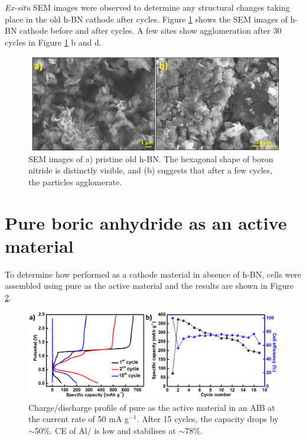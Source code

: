 \textit{Ex-situ} SEM images were observed to determine any structural changes taking place in the old h-BN cathode after cycles. Figure \ref{Figures/BOhBN:hBNSEM} shows the SEM images of h-BN cathode before and after cycles. A few sites show agglomeration after 30 cycles in Figure \ref{Figures/BOhBN:hBNSEM} b and d.

\begin{figure}[tbh!]
\centering
\includegraphics[width=\textwidth]{Figures/BOhBN/hBNSEM}
\caption{SEM images of a) pristine old h-BN. The hexagonal shape of boron nitride is distinctly visible, and (b) suggests that after a few cycles, the particles agglomerate.}
\label{Figures/BOhBN:hBNSEM}
\end{figure}



\section*{Pure boric anhydride  as an active material}
To determine how  performed as a cathode material in absence of h-BN, cells were assembled using pure  as the active material and the results are shown in Figure \ref{Figures/BOhBN:BOCDC}. 

\begin{figure}[tbh!]
\centering
\includegraphics[width=\textwidth]{Figures/BOhBN/BOCDC}
\caption{Charge/discharge profile of pure  as the active material in an AIB at the current rate of 50 mA g$^{-1}$. After 15 cycles, the capacity drops by $\sim$50\%. CE of Al/ is low and  stabilises at $\sim$78\%.}
\label{Figures/BOhBN:BOCDC}
\end{figure}

